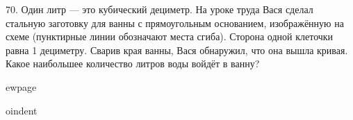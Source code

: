 70. Один литр --- это кубический дециметр. На уроке труда Вася сделал стальную заготовку для ванны с прямоугольным основанием, изображённую на схеме (пунктирные линии обозначают места сгиба). Сторона одной клеточки равна 1 дециметру. Сварив края ванны, Вася обнаружил, что она вышла кривая. Какое наибольшее количество литров воды войдёт в ванну?
\begin{center}
\begin{figure}[ht!]
\end{figure}
\end{center}

ewpage

oindent
